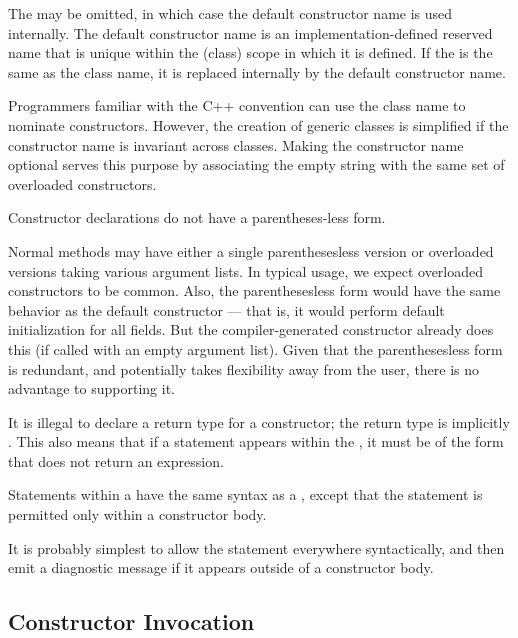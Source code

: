 The  may be omitted, in which case the default
constructor name is used internally.  The default constructor name is an
implementation-defined reserved name that is unique within the (class) scope in
which it is defined.  If the  is
the same as the class name, it is replaced internally by the default constructor name.
\begin{rationale}
Programmers familiar with the C++ convention can use the class name to nominate
constructors.  However, the creation of generic classes is simplified if the
constructor name is invariant across classes.  Making the constructor name
optional serves this purpose by associating the empty string with the same set
of overloaded constructors.
\end{rationale}

Constructor declarations do not have a parentheses-less form.
\begin{rationale}
Normal methods may have either a single parenthesesless version or overloaded
versions taking various argument lists.  In typical usage, we expect overloaded
constructors to be common.  Also, the parenthesesless form would have the same
behavior as the default constructor --- that is, it would perform default
initialization for all fields.  But the compiler-generated constructor already
does this (if called with an empty argument list).  Given that the
parenthesesless form is redundant, and potentially takes flexibility away from
the user, there is no advantage to supporting it.
\end{rationale}

It is illegal to declare a return type for a constructor; the return type is
implicitly .  This also means that if a  statement
appears within the , it must be of the form that does not
return an expression.

Statements within a  have the same syntax as
a , except that the  statement is permitted only
within a constructor body.

\begin{note}
It is probably simplest to allow the  statement everywhere
syntactically, and then emit a diagnostic message if it appears outside of a
constructor body.
\end{note}

\subsection{Constructor Invocation}
\label{Constructor_Invocation}

